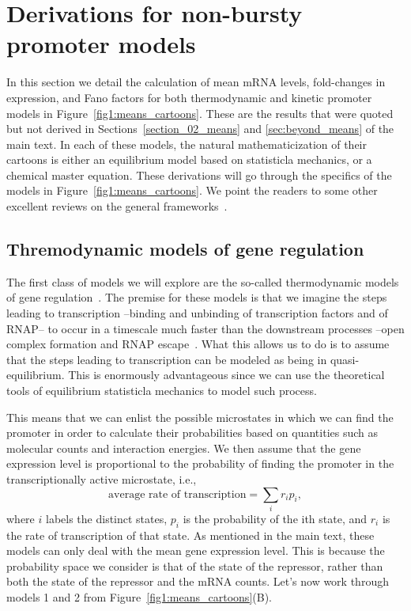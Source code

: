 \section{Derivations for non-bursty promoter models}
\label{sec:non_bursty}

In this section we detail the calculation of mean mRNA levels, fold-changes in
expression, and Fano factors for both thermodynamic and kinetic promoter models
in Figure~\ref{fig1:means_cartoons}. These are the results that were quoted but
not derived in Sections~\ref{section_02_means} and \ref{sec:beyond_means} of the
main text. In each of these models, the natural mathematicization of their
cartoons is either an equilibrium model based on statisticla mechanics, or a
chemical master equation. These derivations will go through the specifics of the
models in Figure~\ref{fig1:means_cartoons}. We point the readers to some other
excellent reviews on the general
frameworks~\cite{Bintu2005a,Sanchez2013,Phillips2015a}.

\subsection{Thremodynamic models of gene regulation}
The first class of models we will explore are the so-called thermodynamic models
of gene regulation~\cite{Ackers1982}. The premise for these models is that we
imagine the steps leading to transcription --binding and unbinding of
transcription factors and of RNAP-- to occur in a timescale much faster than the
downstream processes --open complex formation and RNAP
escape~\cite{Browning2004}. What this allows us to do is to assume that the
steps leading to transcription can be modeled as being in quasi-equilibrium.
This is enormously advantageous since we can use the theoretical tools of 
equilibrium statisticla mechanics to model such process.

This means that we can enlist the possible microstates in which we can find the
promoter in order to calculate their probabilities based on quantities such as
molecular counts and interaction energies. We then assume that the gene
expression level is proportional to the probability of finding the promoter in
the transcriptionally active microstate, i.e.,
\begin{equation}
\text{average rate of transcription} = \sum_i r_i p_i,
\label{eq:rate_transcription_si}
\end{equation}
where $i$ labels the distinct states, $p_i$ is the probability of the ith state,
and $r_i$ is the rate of transcription of that state. As mentioned in the main
text, these models can only deal with the mean gene expression level. This is
because the probability space we consider is that of the state of the repressor,
rather than both the state of the repressor and the mRNA counts. Let's now work
through models 1 and 2 from Figure~\ref{fig1:means_cartoons}(B).

